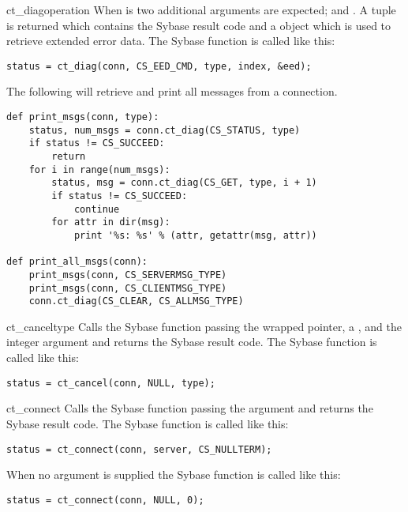 \begin{methoddesc}[CS_CONNECTION]{ct_diag}{operation \optional{, \ldots}}
When  is  two additional arguments are
expected;  and .  A tuple is returned which
contains the Sybase result code and a  object which
is used to retrieve extended error data.  The Sybase
 function is called like this:

\begin{verbatim}
status = ct_diag(conn, CS_EED_CMD, type, index, &eed);
\end{verbatim}

The following will retrieve and print all messages from a connection.

\begin{verbatim}
def print_msgs(conn, type):
    status, num_msgs = conn.ct_diag(CS_STATUS, type)
    if status != CS_SUCCEED:
        return
    for i in range(num_msgs):
        status, msg = conn.ct_diag(CS_GET, type, i + 1)
        if status != CS_SUCCEED:
            continue
        for attr in dir(msg):
            print '%s: %s' % (attr, getattr(msg, attr))

def print_all_msgs(conn):
    print_msgs(conn, CS_SERVERMSG_TYPE)
    print_msgs(conn, CS_CLIENTMSG_TYPE)
    conn.ct_diag(CS_CLEAR, CS_ALLMSG_TYPE)
\end{verbatim}
\end{methoddesc}

\begin{methoddesc}[CS_CONNECTION]{ct_cancel}{type}
Calls the Sybase  function passing the wrapped
 pointer, a  , and the
integer  argument and returns the Sybase result code.  The Sybase
 function is called like this:

\begin{verbatim}
status = ct_cancel(conn, NULL, type);
\end{verbatim}
\end{methoddesc}

\begin{methoddesc}[CS_CONNECTION]{ct_connect}{}
Calls the Sybase  function passing the
 argument and returns the Sybase result code.  The Sybase
 function is called like this:

\begin{verbatim}
status = ct_connect(conn, server, CS_NULLTERM);
\end{verbatim}

When no  argument is supplied the Sybase
 function is called like this:

\begin{verbatim}
status = ct_connect(conn, NULL, 0);
\end{verbatim}
\end{methoddesc}


